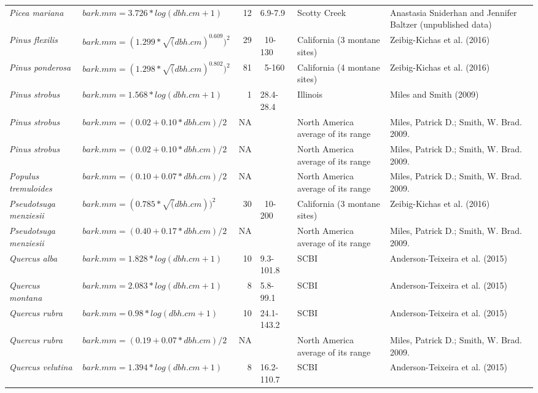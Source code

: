 \documentclass[
]{article}
\begin{document}
\begin{table}[!h]
{\begin{tabular}{>{}llrl>{\raggedright\arraybackslash}p{3cm}>{\raggedright\arraybackslash}p{6cm}}
\addlinespace
\em{Picea mariana} & $bark.mm = 3.726 * log(dbh.cm + 1)$ & 12 & 6.9-7.9 & Scotty Creek & Anastasia Sniderhan and Jennifer Baltzer (unpublished data)\\
\addlinespace
\em{Pinus flexilis} & $bark.mm = (1.299*\sqrt(dbh.cm)^{0.609})^{2}$ & 29 & ~10-130 & California (3 montane sites) & Zeibig-Kichas et al. (2016)\\
\addlinespace
\em{Pinus ponderosa} & $bark.mm = (1.298*\sqrt(dbh.cm)^{0.802})^{2}$ & 81 & ~5-160 & California (4 montane sites) & Zeibig-Kichas et al. (2016)\\
\addlinespace
\em{Pinus strobus} & $bark.mm = 1.568 * log(dbh.cm + 1)$ & 1 & 28.4-28.4 & Illinois & Miles and Smith (2009)\\
\addlinespace
\em{Pinus strobus} & $bark.mm = (0.02 + 0.10 * dbh.cm)/2$ & NA &  & North America average of its range & Miles, Patrick D.; Smith, W. Brad. \vphantom{1} 2009.\\
\addlinespace
\em{Pinus strobus} & $bark.mm = (0.02 + 0.10 * dbh.cm)/2$ & NA &  & North America average of its range & Miles, Patrick D.; Smith, W. Brad. 2009.\\
\addlinespace
\em{Populus tremuloides} & $bark.mm = (0.10 + 0.07 * dbh.cm)/2$ & NA &  & North America average of its range & Miles, Patrick D.; Smith, W. Brad. 2009.\\
\addlinespace
\em{Pseudotsuga menziesii} & $bark.mm = (0.785*\sqrt(dbh.cm))^{2}$ & 30 & ~10-200 & California (3 montane sites) & Zeibig-Kichas et al. (2016)\\
\addlinespace
\em{Pseudotsuga menziesii} & $bark.mm = (0.40 + 0.17 * dbh.cm)/2$ & NA &  & North America average of its range & Miles, Patrick D.; Smith, W. Brad. 2009.\\
\addlinespace
\em{Quercus alba} & $bark.mm = 1.828 * log(dbh.cm + 1)$ & 10 & 9.3-101.8 & SCBI & Anderson-Teixeira et al. (2015)\\
\addlinespace
\em{Quercus montana} & $bark.mm = 2.083 * log(dbh.cm + 1)$ & 8 & 5.8-99.1 & SCBI & Anderson-Teixeira et al. (2015)\\
\addlinespace
\em{Quercus rubra} & $bark.mm = 0.98 * log(dbh.cm + 1)$ & 10 & 24.1-143.2 & SCBI & Anderson-Teixeira et al. (2015)\\
\addlinespace
\em{Quercus rubra} & $bark.mm = (0.19 + 0.07 * dbh.cm)/2$ & NA &  & North America average of its range & Miles, Patrick D.; Smith, W. Brad. 2009.\\
\addlinespace
\em{Quercus velutina} & $bark.mm = 1.394 * log(dbh.cm + 1)$ & 8 & 16.2-110.7 & SCBI & Anderson-Teixeira et al. (2015)\\

\end{tabular}}
\end{table}
\end{document}
